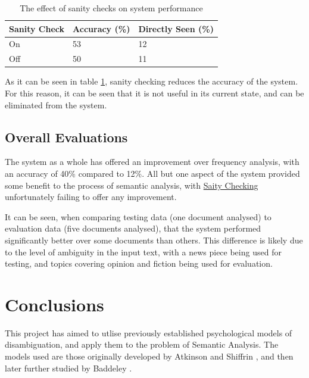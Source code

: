 \documentclass[]{article}
\begin{document}
\begin{table}
\begin{center}
\begin{tabular}{|p{5em}|p{7em}|p{7em}|}
	\hline
	Sanity Check & Accuracy (\%) & Directly Seen (\%) \\
	\hline
	On & 53 & 12\\
	\hline
	Off & 50 & 11\\
	\hline
\end{tabular}
\end{center}
\caption{The effect of sanity checks on system performance}
\label{table:Sanity}
\end{table}

As it can be seen in table \ref{table:Sanity}, sanity checking reduces the accuracy of the system. For this reason, it can be seen that it is not useful in its current state, and can be eliminated from the system.

\subsection{Overall Evaluations}
\label{EvOverall}
The system as a whole has offered an improvement over frequency analysis, with an accuracy of 40\% compared to 12\%. All but one aspect of the system provided some benefit to the process of semantic analysis, with \hyperref[sec:EvSanity]{Saity Checking} unfortunately failing to offer any improvement. 

It can be seen, when comparing testing data (one document analysed) to evaluation data (five documents analysed), that the system performed significantly better over some documents than others. This difference is likely due to the level of ambiguity in the input text, with a news piece being used for testing, and topics covering opinion and fiction being used for evaluation.





\section{Conclusions}
\label{sec:Conclusions}
This project has aimed to utlise previously established psychological models of disambiguation, and apply them to the problem of Semantic Analysis. The models used are those originally developed by Atkinson and Shiffrin \cite{ControlProcessesSTMAtkinson}, and then later further studied by Baddeley \cite{MemoryBaddeleyEysenkAnderson}.
\end{document}
